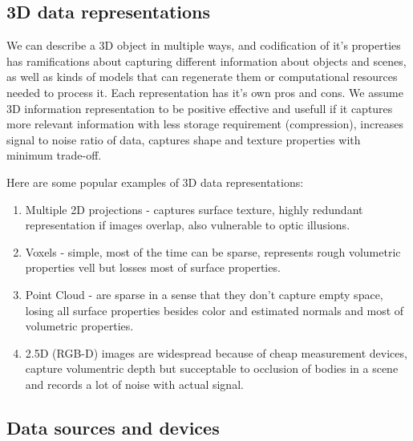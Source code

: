 \subsection{3D data representations}

We can describe a 3D object in multiple ways, and codification of it's properties has ramifications about capturing different information about objects and scenes, as well as kinds of models that can regenerate them or computational resources needed to process it.
Each representation has it's own pros and cons. We assume 3D information representation to be positive effective and usefull if it captures more relevant information with less storage requirement (compression), increases signal to noise ratio of data, captures shape and texture properties with minimum trade-off.

Here are some popular examples of 3D data representations:
\begin{enumerate}
	\item Multiple 2D projections - captures surface texture, highly redundant representation if images overlap, also vulnerable to optic illusions.
	\item Voxels - simple, most of the time can be sparse, represents rough volumetric properties vell but losses most of surface properties.
	\item Point Cloud - are sparse in a sense that they don't capture empty space, losing all surface properties besides color and estimated normals and most of volumetric properties.
	\item 2.5D (RGB-D) images are widespread because of cheap measurement devices, capture volumentric depth but succeptable to occlusion of bodies in a scene and records a lot of noise with actual signal.
\end{enumerate}

\subsection{Data sources and devices}